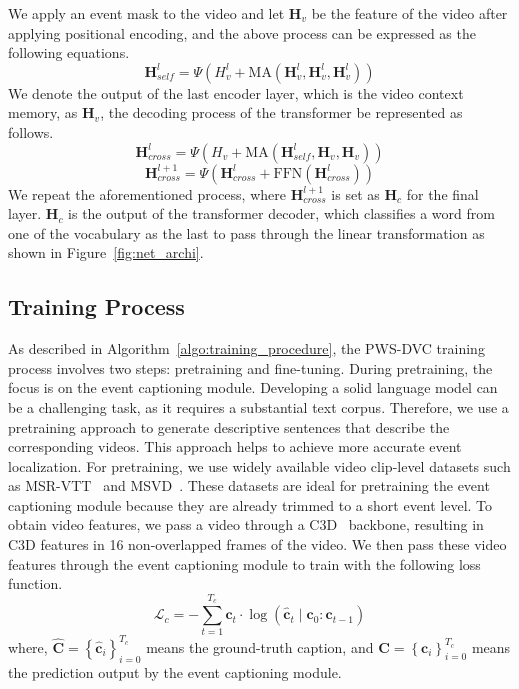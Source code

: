 We apply an event mask to the video and let $\bm{H}_v$ be the feature of the video after applying positional encoding, and the above process can be expressed as the following equations.
\begin{equation}
    \bm{H}^{l}_{self} = \Psi \left(H_v^l + \text{MA}\left( \bm{H}_v^l, \bm{H}_v^l, \bm{H}_v^l \right) \right)
\end{equation}
We denote the output of the last encoder layer, which is the video context memory, as $\bm{H}_v$, the decoding process of the transformer be represented as follows.
\begin{equation}
    \bm{H}^l_{cross} = \Psi \left( H_v + \text{MA}\left( \bm{H}^{l}_{self}, \bm{H}_v, \bm{H}_v \right) \right)
\end{equation}
\begin{equation}
    \bm{H}_{cross}^{l+1} = \Psi \left( \bm{H}^{l}_{cross} + \text{FFN} \left( \bm{H}^{l}_{cross} \right) \right)
\end{equation}
We repeat the aforementioned process, where $\bm{H}_{cross}^{l+1}$ is set as $\bm{H}_c$ for the final layer.
$\bm{H}_c$ is the output of the transformer decoder, which classifies a word from one of the vocabulary as the last to pass through the linear transformation as shown in Figure~\ref{fig:net_archi}.

\subsection{Training Process}
As described in Algorithm~\ref{algo:training_procedure}, the PWS-DVC training process involves two steps: pretraining and fine-tuning.
During pretraining, the focus is on the event captioning module.
Developing a solid language model can be a challenging task, as it requires a substantial text corpus.
Therefore, we use a pretraining approach to generate descriptive sentences that describe the corresponding videos.
This approach helps to achieve more accurate event localization.
For pretraining, we use widely available video clip-level datasets such as MSR-VTT~\cite{Xu2016-ti} and MSVD~\cite{Chen2011-ai}.
These datasets are ideal for pretraining the event captioning module because they are already trimmed to a short event level.
To obtain video features, we pass a video through a C3D~\cite{Tran2015-uq} backbone, resulting in C3D features in 16 non-overlapped frames of the video.
We then pass these video features through the event captioning module to train with the following loss function.
\begin{equation}
    \mathcal{L}_c=-\sum_{t=1}^{T_c} \bm{c}_t \cdot \log \left(\hat{\bm{c}}_t \mid \bm{c}_0: \bm{c}_{t-1}\right)
    \label{eq:loss_ec}
\end{equation}
where, $\hat{\bm{C}}=\left\{\hat{\bm{c}}_i\right\}_{i=0}^{T_c}$ means the ground-truth caption, and $\bm{C}=\left\{\bm{c}_i\right\}_{i=0}^{T_c}$ means the prediction output by the event captioning module.

